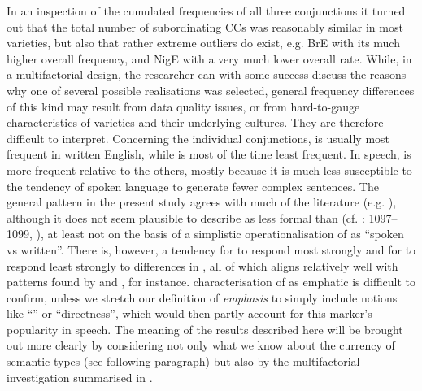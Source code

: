 \begin{sloppypar}
In an inspection of the cumulated frequencies of all three conjunctions it turned out that the total number of subordinating CCs was reasonably similar in most varieties, but also that rather extreme outliers do exist, e.g. BrE with its much higher overall frequency, and NigE with a very much lower overall rate. While, in a multifactorial design, the researcher can with some success discuss the reasons why one of several possible realisations was selected, general frequency differences of this kind may result from data quality issues, or from hard-to-gauge characteristics of varieties and their underlying cultures. They are therefore difficult to interpret. Concerning the individual conjunctions,  is usually most frequent in written English, while  is most of the time least frequent. In speech,  is more frequent relative to the others, mostly because it is much less susceptible to the tendency of spoken language to generate fewer complex sentences. The general pattern in the present study agrees with much of the literature (e.g. \citealt{QuirkEtAl1985,Altenberg1986,Aarts1988}), although it does not seem plausible to describe  as less formal than  (cf. \citealt{QuirkEtAl1985}: 1097–1099, \citealt{BiberEtAl1999,HuddlestonPullum2002}), at least not on the basis of a simplistic operationalisation of  as “spoken vs written”. There is, however, a tendency for  to respond most strongly and for  to respond least strongly to differences in , all of which aligns relatively well with patterns found by \citet{Altenberg1986} and \citet{Aarts1988}, for instance.   characterisation of  as emphatic is difficult to confirm, unless we stretch our definition of \textit{emphasis} to simply include notions like “” or “directness”, which would then partly account for this marker’s popularity in speech. The meaning of the results described here will be brought out more clearly by considering not only what we know about the currency of semantic types (see following paragraph) but also by the multifactorial investigation summarised in .
\end{sloppypar}

